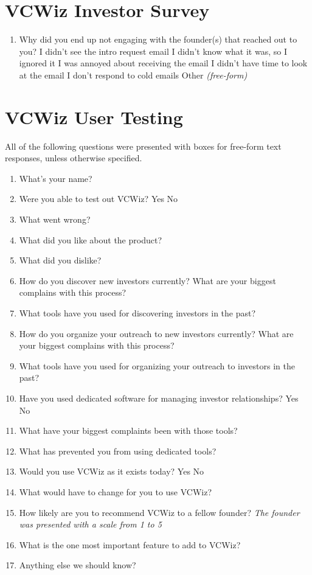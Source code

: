 \section{VCWiz Investor Survey}
\label{appf:survey:investors}

\begin{enumerate}
  \item Why did you end up not engaging with the founder(s) that reached out to you?
    \subitem I didn't see the intro request email
    \subitem I didn't know what it was, so I ignored it
    \subitem I was annoyed about receiving the email
    \subitem I didn't have time to look at the email
    \subitem I don't respond to cold emails
    \subitem Other \textit{(free-form)}
\end{enumerate}

\section{VCWiz User Testing}
\label{appf:survey:users}

All of the following questions were presented with boxes for free-form text responses, unless otherwise specified.

\begin{enumerate}
  \item What's your name?
  \item Were you able to test out VCWiz?
    \subitem Yes
    \subitem No
  \item What went wrong?
  \item What did you like about the product?
  \item What did you dislike?
  \item How do you discover new investors currently? What are your biggest complains with this process?
  \item What tools have you used for discovering investors in the past?
  \item How do you organize your outreach to new investors currently? What are your biggest complains with this process?
  \item What tools have you used for organizing your outreach to investors in the past?
  \item Have you used dedicated software for managing investor relationships?
    \subitem Yes
    \subitem No
  \item What have your biggest complaints been with those tools?
  \item What has prevented you from using dedicated tools?
  \item Would you use VCWiz as it exists today?
    \subitem Yes
    \subitem No
  \item What would have to change for you to use VCWiz?
  \item How likely are you to recommend VCWiz to a fellow founder?
    \subitem \textit{The founder was presented with a scale from 1 to 5}
  \item What is the one most important feature to add to VCWiz?
  \item Anything else we should know?
\end{enumerate}

\clearpage
\newpage
